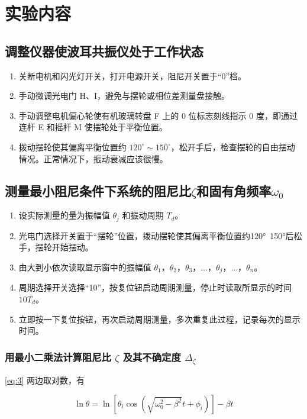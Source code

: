 \documentclass[12pt,a4paper]{amsart}
\begin{document}
\section{实验内容}

\subsection{调整仪器使波耳共振仪处于工作状态}

\begin{enumerate}
	\item 关断电机和闪光灯开关，打开电源开关，阻尼开关置于“0”档。
	\item 手动微调光电门 H、I，避免与摆轮或相位差测量盘接触。
	\item 手动调整电机偏心轮使有机玻璃转盘 F 上的 0 位标志刻线指示 0 度，即通过连杆 E 和摇杆 M 使摆轮处于平衡位置。
	\item 拨动摆轮使其偏离平衡位置约 $120^\circ\sim 150^\circ$，松开手后，检查摆轮的自由摆动情况。正常情况下，振动衰减应该很慢。
    
\end{enumerate}

\subsection{测量最小阻尼条件下系统的阻尼比$\zeta$和固有角频率$\omega_0$}
\begin{enumerate}
    \item 设实际测量的量为振幅值 $\theta_j$ 和振动周期 $T_d$。
	\item 光电门选择开关置于“摆轮”位置，拨动摆轮使其偏离平衡位置约120°~150°后松手，摆轮开始摆动。
    \item 由大到小依次读取显示窗中的振幅值 $\theta_1$，$\theta_2$，$\theta_3$，$\dots$，$\theta_j$，$\dots$，$\theta_n$。
    \item 周期选择开关选择“10”，按复位钮启动周期测量，停止时读取所显示的时间 $10\overline{T_d}$。
    \item 立即按一下复位按钮，再次启动周期测量，多次重复此过程，记录每次的显示时间。
\end{enumerate}

\subsubsection{用最小二乘法计算阻尼比 $\zeta$ 及其不确定度 $\Delta_\zeta$}

\ref{eq:3} 两边取对数，有

\begin{equation}
	\ln\theta = \ln[\theta_i\cos(\sqrt{\omega_0^2-\beta^2}t+\phi_i)] - \beta t \label{eq:14}
\end{equation}
\end{document}
